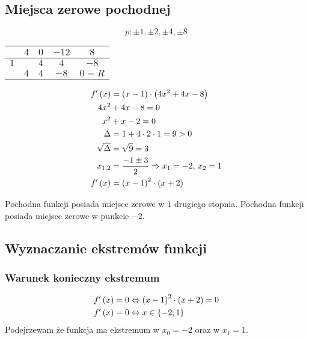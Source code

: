 \documentclass[a4paper,12pt]{article}
\newcommand{\podx}{
		\ensuremath f' \left( x \right)
	}
\begin{document}
\subsection{Miejsca zerowe pochodnej}
\[ p: \pm 1, \pm 2, \pm 4, \pm 8\]
\begin{center}
	\begin{tabular}{l|c|c|c|c}		
		& $4$	& $0$	& $-12$	& $8$	\\ \hline
	$1$	&	& $4$	& $4$	& $-8$	\\ \hline
		& $4$	& $4$	& $-8$	& $0 = R$\\ 
	\end{tabular}
\end{center}
\begin{align*}
	\podx &= \left( x - 1 \right) \cdot \left( 4x^2 + 4x - 8 \right) \\
	4x^2 &+ 4x - 8 = 0 \\
	x^2 &+ x - 2 = 0 \\
	\Delta &= 1 + 4 \cdot 2 \cdot 1 = 9 > 0\\
	\sqrt{\Delta} &= \sqrt{9} = 3\\
	x_{1, 2} &= \frac{-1 \pm 3}{2} \Rightarrow x_1 = -2, \, x_2 = 1\\
	\podx &= \left( x - 1 \right)^2 \cdot \left( x + 2 \right)
\end{align*}

Pochodna funkcji posiada miejsce zerowe w $1$ drugiego stopnia. Pochodna funkcji posiada miejsce zerowe w punkcie $-2$. 

\subsection{Wyznaczanie ekstremów funkcji}
\subsubsection*{Warunek konieczny ekstremum}

\begin{align*}
	\podx &= 0 \Leftrightarrow \left( x - 1 \right)^2 \cdot \left( x + 2 \right)  = 0\\
	\podx &= 0 \Leftrightarrow x \in \left\{ -2; 1 \right\}
\end{align*}
Podejrzewam że funkcja ma ekstremum w $x_0 = -2$ oraz w $x_1 = 1$.
\begin{figure}[h]
	\centering
\end{figure}
\end{document}
